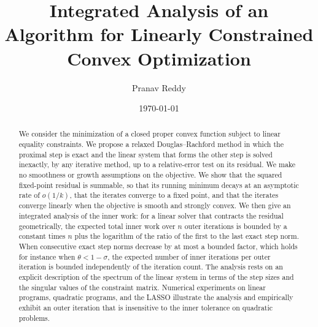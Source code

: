 \documentclass[11pt]{article}
\title{Integrated Analysis of an Algorithm for Linearly Constrained Convex Optimization}
\author{Pranav Reddy}
\date{\small \today \vspace{-5mm}}
\begin{document}
\maketitle

\begin{abstract}
    We consider the minimization of a closed proper convex function subject to linear equality constraints.
    We propose a relaxed Douglas--Rachford method in which the proximal step is exact and the linear system that forms the other step is solved inexactly, by any iterative method, up to a relative-error test on its residual.
    We make no smoothness or growth assumptions on the objective.
    We show that the squared fixed-point residual is summable, so that its running minimum decays at an asymptotic rate of $o(1/k)$, that the iterates converge to a fixed point, and that the iterates converge linearly when the objective is smooth and strongly convex.
    We then give an integrated analysis of the inner work: for a linear solver that contracts the residual geometrically, the expected total inner work over $n$ outer iterations is bounded by a constant times $n$ plus the logarithm of the ratio of the first to the last exact step norm.
    When consecutive exact step norms decrease by at most a bounded factor, which holds for instance when $\theta < 1 - \sigma$, the expected number of inner iterations per outer iteration is bounded independently of the iteration count.
    The analysis rests on an explicit description of the spectrum of the linear system in terms of the step sizes and the singular values of the constraint matrix.
    Numerical experiments on linear programs, quadratic programs, and the LASSO illustrate the analysis and empirically exhibit an outer iteration that is insensitive to the inner tolerance on quadratic problems.
\end{abstract}
\end{document}

